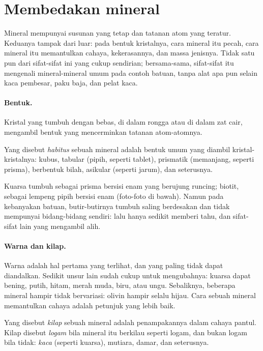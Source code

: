 \section{Membedakan mineral}

Mineral mempunyai susunan yang tetap dan tatanan atom yang teratur. Keduanya
tampak dari luar: pada bentuk kristalnya, cara mineral itu pecah, cara mineral itu
memantulkan cahaya, kekerasannya, dan massa jenisnya. Tidak satu pun dari
sifat-sifat ini yang cukup sendirian; bersama-sama, sifat-sifat itu mengenali
mineral-mineral umum pada contoh batuan, tanpa alat apa pun selain kaca
pembesar, paku baja, dan pelat kaca.

\paragraph{Bentuk.} Kristal yang tumbuh dengan bebas, di dalam rongga atau di
dalam zat cair, mengambil bentuk yang mencerminkan tatanan atom-atomnya.

\begin{definition}[Habitus]\label{def:g11:minerals:habit}
Yang disebut \emph{habitus} sebuah mineral adalah bentuk
umum yang diambil kristal-kristalnya: kubus, tabular (pipih, seperti tablet),
prismatik (memanjang, seperti prisma), berbentuk bilah, asikular (seperti jarum),
dan seterusnya.
\end{definition}

Kuarsa tumbuh sebagai prisma bersisi enam yang berujung runcing; biotit, sebagai
lempeng pipih bersisi enam (foto-foto di bawah). Namun pada kebanyakan batuan,
butir-butirnya tumbuh saling berdesakan dan tidak mempunyai bidang-bidang sendiri:
 lalu hanya sedikit memberi tahu, dan sifat-sifat lain yang mengambil alih.

\paragraph{Warna dan kilap.} Warna adalah hal pertama yang terlihat, dan yang
paling tidak dapat diandalkan. Sedikit unsur lain sudah cukup untuk mengubahnya:
kuarsa dapat bening, putih, hitam, merah muda, biru, atau ungu. Sebaliknya,
beberapa mineral hampir tidak bervariasi: olivin hampir selalu hijau. Cara sebuah
mineral memantulkan cahaya adalah petunjuk yang lebih baik.

\begin{definition}[Kilap]\label{def:g11:minerals:lustre}
Yang disebut \emph{kilap} sebuah mineral adalah penampakannya dalam
cahaya pantul. Kilap disebut \emph{logam} bila mineral itu berkilau seperti
logam, dan bukan logam bila tidak: \emph{kaca} (seperti kuarsa), mutiara, damar,
dan seterusnya.
\end{definition}


